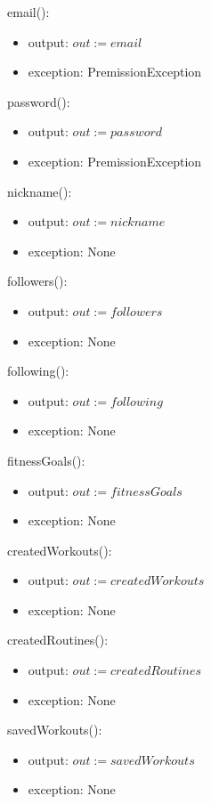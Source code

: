 \documentclass[12pt, titlepage]{article}
\begin{document}
\noindent email():
\begin{itemize}
	\item output: $out := email$
	\item exception: PremissionException
\end{itemize}

\noindent password():
\begin{itemize}
	\item output: $out := password$
	\item exception: PremissionException
\end{itemize}

\noindent nickname():
\begin{itemize}
	\item output: $out := nickname$
	\item exception: None
\end{itemize}

\noindent followers():
\begin{itemize}
	\item output: $out := followers$
	\item exception: None
\end{itemize}

\noindent following():
\begin{itemize}
	\item output: $out := following$
	\item exception: None
\end{itemize}

\noindent fitnessGoals():
\begin{itemize}
	\item output: $out := fitnessGoals$
	\item exception: None
\end{itemize}

\noindent createdWorkouts():
\begin{itemize}
	\item output: $out := createdWorkouts$
	\item exception: None
\end{itemize}

\noindent createdRoutines():
\begin{itemize}
	\item output: $out := createdRoutines$
	\item exception: None
\end{itemize}

\noindent savedWorkouts():
\begin{itemize}
	\item output: $out := savedWorkouts$
	\item exception: None
\end{itemize}
\end{document}
